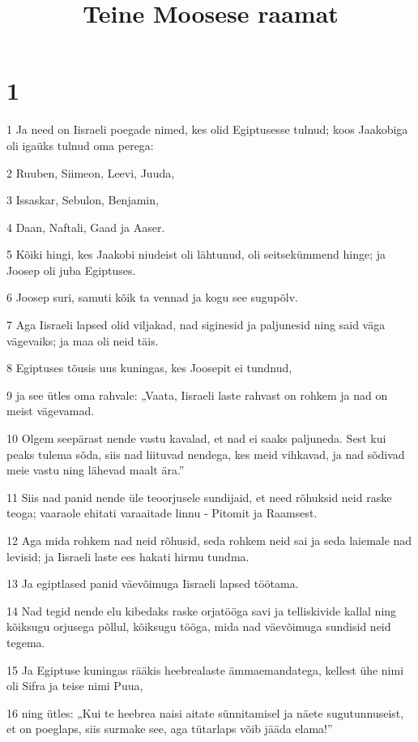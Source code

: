 

\title{Teine Moosese raamat}


\chapter{1}

\par 1 Ja need on Iisraeli poegade nimed, kes olid Egiptusesse tulnud; koos Jaakobiga oli igaüks tulnud oma perega:
\par 2 Ruuben, Siimeon, Leevi, Juuda,
\par 3 Issaskar, Sebulon, Benjamin,
\par 4 Daan, Naftali, Gaad ja Aaser.
\par 5 Kõiki hingi, kes Jaakobi niudeist oli lähtunud, oli seitsekümmend hinge; ja Joosep oli juba Egiptuses.
\par 6 Joosep suri, samuti kõik ta vennad ja kogu see sugupõlv.
\par 7 Aga Iisraeli lapsed olid viljakad, nad siginesid ja paljunesid ning said väga vägevaiks; ja maa oli neid täis.
\par 8 Egiptuses tõusis uus kuningas, kes Joosepit ei tundnud,
\par 9 ja see ütles oma rahvale: „Vaata, Iisraeli laste rahvast on rohkem ja nad on meist vägevamad.
\par 10 Olgem seepärast nende vastu kavalad, et nad ei saaks paljuneda. Sest kui peaks tulema sõda, siis nad liituvad nendega, kes meid vihkavad, ja nad sõdivad meie vastu ning lähevad maalt ära.”
\par 11 Siis nad panid nende üle teoorjusele sundijaid, et need rõhuksid neid raske teoga; vaaraole ehitati varaaitade linnu - Pitomit ja Raamsest.
\par 12 Aga mida rohkem nad neid rõhusid, seda rohkem neid sai ja seda laiemale nad levisid; ja Iisraeli laste ees hakati hirmu tundma.
\par 13 Ja egiptlased panid väevõimuga Iisraeli lapsed töötama.
\par 14 Nad tegid nende elu kibedaks raske orjatööga savi ja telliskivide kallal ning kõiksugu orjusega põllul, kõiksugu tööga, mida nad väevõimuga sundisid neid tegema.
\par 15 Ja Egiptuse kuningas rääkis heebrealaste ämmaemandatega, kellest ühe nimi oli Sifra ja teise nimi Puua,
\par 16 ning ütles: „Kui te heebrea naisi aitate sünnitamisel ja näete sugutunnuseist, et on poeglaps, siis surmake see, aga tütarlaps võib jääda elama!”
